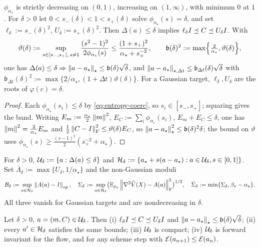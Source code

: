 \begin{corollary}
\label{cor:band}
$\phi_{\alpha_\star}$ is strictly decreasing on $(0,1)$, increasing on $(1,\infty)$, with minimum
$0$ at $1$. For $\delta>0$ let $0<s_-(\delta)<1<s_+(\delta)$ solve $\phi_{\alpha_\star}(s)=\delta$,
and set $\ell_\delta:=s_-(\delta)^2$, $U_\delta:=s_+(\delta)^2$. Then $\Delta(a)\leq\delta$ implies
$\ell_\delta I\preceq C\preceq U_\delta I$. With
\[
    \vartheta(\delta):=\sup_{s\in[s_-,s_+],\,s\neq1}\frac{(s^2-1)^2}{2\phi_{\alpha_\star}(s)}
    \leq\frac{(1+s_+)^2}{\alpha_\star+s_+^{-2}},
    \qquad
    \mathfrak b(\delta)^2:=\max\Bigl\{\tfrac2{\alpha_\star},\vartheta(\delta)\Bigr\},
\]
one has $\Delta(a)\leq\delta\Rightarrow\left\lVert a-a_\star\right\rVert_\star\leq\mathfrak b(\delta)\sqrt\delta$, and
$\left\lVert a-a_\star\right\rVert_{\star,\Delta t}\leq\mathfrak b_{\Delta t}(\delta)\sqrt\delta$ with
$\mathfrak b_{\Delta t}(\delta)^2:=\max\{2/\alpha_\star,(1+\Delta t)\vartheta(\delta)\}$. For a
Gaussian target, $\ell_\delta,U_\delta$ are the roots of $\varphi(c)=\delta$.
\end{corollary}

\begin{proof}
Each $\phi_{\alpha_\star}(s_i)\leq\delta$ by \eqref{eq:entropy-coerc}, so $s_i\in[s_-,s_+]$; squaring
gives the band. Writing $E_m:=\tfrac{\alpha_\star}2\left\lVert m\right\rVert^2$, $E_C:=\sum_i\phi_{\alpha_\star}(s_i)$,
$E_m+E_C\leq\delta$, one has $\left\lVert m\right\rVert^2=\tfrac2{\alpha_\star}E_m$ and
$\tfrac12\left\lVert C-I\right\rVert_{\mathrm{F}}^2\leq\vartheta(\delta)E_C$, so
$\left\lVert a-a_\star\right\rVert_\star^2\leq\mathfrak b(\delta)^2\delta$; the bound on $\vartheta$ uses
$\phi_{\alpha_\star}(s)\geq\tfrac{(s-1)^2}2(s_+^{-2}+\alpha_\star)$.
\end{proof}

\begin{definition}
\label{def:region}
For $\delta>0$, $\mathcal{U}_\delta:=\{a:\Delta(a)\leq\delta\}$ and
$\mathcal{H}_\delta:=\{a_\star+s(a-a_\star):a\in\mathcal{U}_\delta,s\in[0,1]\}$. Set
$\bar\Lambda_\delta:=\max\{U_\delta,1/\alpha_\star\}$ and the non-Gaussian moduli
\[
    \mathcal B_\delta:=\sup_{a\in\mathcal{H}_\delta}\left\lVert A(a)-I\right\rVert_{\mathrm{op}},
    \quad
    \Sigma_\delta:=\sup_{a\in\mathcal{H}_\delta}\bigl(\mathbb{E}_{\rho_a}\left\lVert \nabla^2\widehat V(X)-A(a)\right\rVert_{\mathrm{F}}^2\bigr)^{1/2},
    \quad
    \bar\Sigma_\delta:=\min\{\Sigma_\delta,\beta_\star-\alpha_\star\}.
\]
All three vanish for Gaussian targets and are nondecreasing in $\delta$.
\end{definition}

\begin{lemma}
\label{lem:region-geom}
Let $\delta>0$, $a=(m,C)\in\mathcal{U}_\delta$. Then (i) $\ell_\delta I\preceq C\preceq U_\delta I$ and
$\left\lVert a-a_\star\right\rVert_\star\leq\mathfrak b(\delta)\sqrt\delta$; (ii) every $a'\in\mathcal{H}_\delta$ satisfies
the same bounds; (iii) $\mathcal{U}_\delta$ is compact; (iv) $\mathcal{U}_\delta$ is forward invariant for the
flow, and for any scheme step with $\mathcal{E}(a_{n+1})\leq\mathcal{E}(a_n)$.
\end{lemma}

